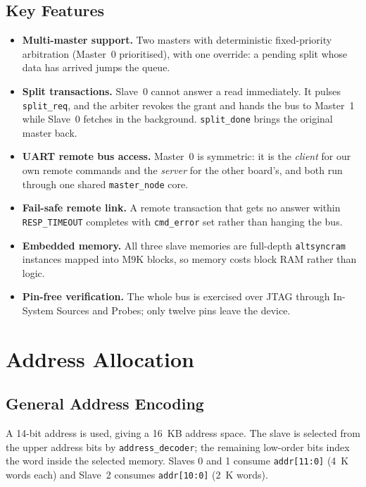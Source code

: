 \documentclass[11pt,a4paper]{article}
\newcommand{\sig}[1]{\texttt{#1}}
\begin{document}
\subsection{Key Features}

\begin{itemize}
    \item \textbf{Multi-master support.} Two masters with deterministic
          fixed-priority arbitration (Master~0 prioritised), with one override:
          a pending split whose data has arrived jumps the queue.
    \item \textbf{Split transactions.} Slave~0 cannot answer a read
          immediately. It pulses \sig{split\_req}, and the arbiter revokes the
          grant and hands the bus to Master~1 while Slave~0 fetches in the
          background. \sig{split\_done} brings the original master back.
    \item \textbf{UART remote bus access.} Master~0 is symmetric: it is the
          \emph{client} for our own remote commands and the \emph{server} for
          the other board's, and both run through one shared \sig{master\_node}
          core.
    \item \textbf{Fail-safe remote link.} A remote transaction that gets no
          answer within \sig{RESP\_TIMEOUT} completes with \sig{cmd\_error} set
          rather than hanging the bus.
    \item \textbf{Embedded memory.} All three slave memories are full-depth
          \sig{altsyncram} instances mapped into M9K blocks, so memory costs
          block RAM rather than logic.
    \item \textbf{Pin-free verification.} The whole bus is exercised over JTAG
          through In-System Sources and Probes; only twelve pins leave the
          device.
\end{itemize}

\section{Address Allocation}

\subsection{General Address Encoding}

A 14-bit address is used, giving a 16~KB address space. The slave is selected
from the upper address bits by \sig{address\_decoder}; the remaining low-order
bits index the word inside the selected memory. Slaves 0 and 1 consume
\sig{addr[11:0]} (4~K words each) and Slave~2 consumes \sig{addr[10:0]}
(2~K words).
\end{document}
